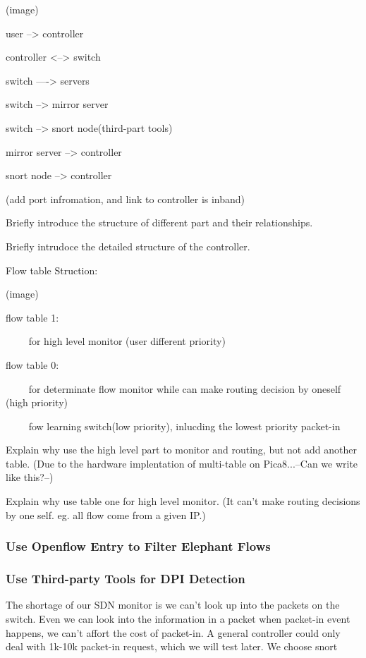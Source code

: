 \documentclass{acm_proc_article-sp}
\begin{document}
(image)

             user --> controller

             controller <--> switch

             switch ----> servers

             switch --> mirror server

             switch --> snort node(third-part tools)

             mirror server --> controller

             snort node --> controller

             (add port infromation, and link to controller is inband)


Briefly introduce the structure of different part and their relationships.

Briefly intrudoce the detailed structure of the controller.

Flow table Struction:

(image)

            flow table 1:

            ~~~~ for high level monitor (user different priority)

            flow table 0:

            ~~~~ for determinate flow monitor while can make routing decision by oneself (high priority)

            ~~~~ fow learning switch(low priority), inlucding the lowest priority packet-in


Explain why use the high level part to monitor and routing, but not add another table. (Due to the hardware implentation of multi-table on Pica8...--Can we write like this?--)

Explain why use table one for high level monitor. (It can't make routing decisions by one self. eg. all flow come from a given IP.)




\subsubsection{Use Openflow Entry to Filter Elephant Flows}


\subsubsection{Use Third-party Tools for DPI Detection}
The shortage of our SDN monitor is we can't look up into the packets on the switch. Even we can look into the information in a packet when packet-in event happens, we can't affort the cost of packet-in. A general controller could only deal with 1k-10k packet-in request, which we will test later.
We choose snort
\end{document}
